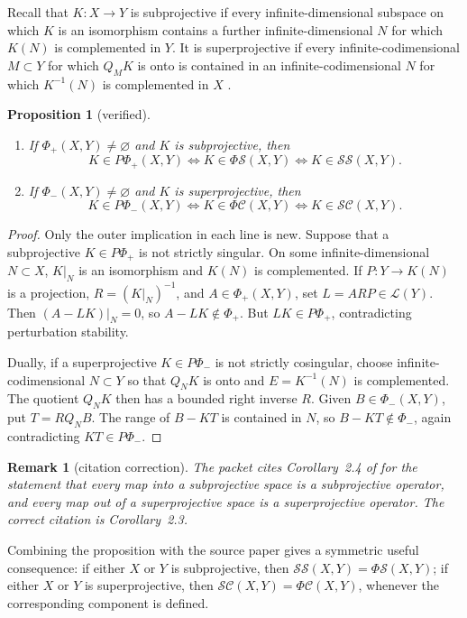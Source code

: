 \documentclass[11pt]{article}
\newtheorem{proposition}[theorem]{Proposition}
\newtheorem{remark}[theorem]{Remark}
\theoremstyle{definition}
\newcommand{\Lop}{\mathcal L}
\newcommand{\SSing}{\mathcal{SS}}
\newcommand{\SCos}{\mathcal{SC}}
\newcommand{\PhiS}{\Phi\mathcal S}
\newcommand{\PhiC}{\Phi\mathcal C}
\newcommand{\PhiP}{\Phi_+}
\newcommand{\PhiM}{\Phi_-}
\newcommand{\PPhiP}{P\Phi_+}
\newcommand{\PPhiM}{P\Phi_-}
\begin{document}
Recall that \(K\colon X\to Y\) is subprojective if every infinite-dimensional subspace on
which \(K\) is an isomorphism contains a further infinite-dimensional \(N\) for which
\(K(N)\) is complemented in \(Y\).  It is superprojective if every infinite-codimensional
\(M\subset Y\) for which \(Q_MK\) is onto is contained in an infinite-codimensional
\(N\) for which \(K^{-1}(N)\) is complemented in \(X\) \cite{GP2024}.

\begin{proposition}[verified]
\begin{enumerate}[label=\rm(\roman*)]
\item If \(\PhiP(X,Y)\ne\varnothing\) and \(K\) is subprojective, then
\[
 K\in\PPhiP(X,Y)\iff K\in\PhiS(X,Y)\iff K\in\SSing(X,Y).
\]
\item If \(\PhiM(X,Y)\ne\varnothing\) and \(K\) is superprojective, then
\[
 K\in\PPhiM(X,Y)\iff K\in\PhiC(X,Y)\iff K\in\SCos(X,Y).
\]
\end{enumerate}
\end{proposition}

\begin{proof}
Only the outer implication in each line is new.  Suppose that a subprojective
\(K\in\PPhiP\) is not strictly singular.  On some infinite-dimensional \(N\subset X\),
\(K|_N\) is an isomorphism and \(K(N)\) is complemented.  If \(P\colon Y\to K(N)\)
is a projection, \(R=(K|_N)^{-1}\), and \(A\in\PhiP(X,Y)\), set
\(L=ARP\in\Lop(Y)\).  Then \((A-LK)|_N=0\), so \(A-LK\notin\PhiP\).  But
\(LK\in\PPhiP\), contradicting perturbation stability.

Dually, if a superprojective \(K\in\PPhiM\) is not strictly cosingular, choose
infinite-codimensional \(N\subset Y\) so that \(Q_NK\) is onto and
\(E=K^{-1}(N)\) is complemented.  The quotient \(Q_NK\) then has a bounded right
inverse \(R\).  Given \(B\in\PhiM(X,Y)\), put \(T=RQ_NB\).  The range of
\(B-KT\) is contained in \(N\), so \(B-KT\notin\PhiM\), again contradicting
\(KT\in\PPhiM\).
\end{proof}

\begin{remark}[citation correction]
The packet cites Corollary~2.4 of \cite{GP2024} for the statement that every map into a
subprojective space is a subprojective operator, and every map out of a superprojective
space is a superprojective operator.  The correct citation is Corollary~2.3.
\end{remark}

Combining the proposition with the source paper gives a symmetric useful consequence:
if either \(X\) or \(Y\) is subprojective, then
\(\SSing(X,Y)=\PhiS(X,Y)\); if either \(X\) or \(Y\) is superprojective, then
\(\SCos(X,Y)=\PhiC(X,Y)\), whenever the corresponding component is defined.
\end{document}
